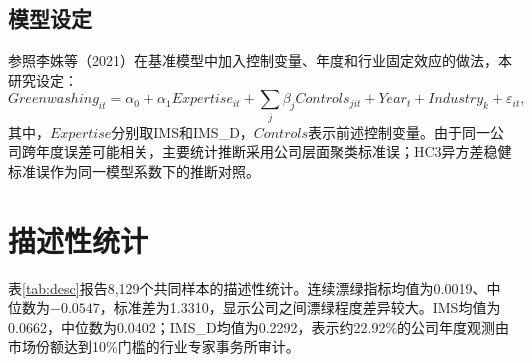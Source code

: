 \documentclass[UTF8,12pt,a4paper]{ctexart}
\begin{document}
\subsection{模型设定}

参照李姝等（2021）在基准模型中加入控制变量、年度和行业固定效应的做法，本研究设定：
\begin{equation}
Greenwashing_{it}=\alpha_0+\alpha_1Expertise_{it}
+\sum_j\beta_j Controls_{jit}+Year_t+Industry_k+\varepsilon_{it},
\label{eq:baseline}
\end{equation}
其中，$Expertise$分别取IMS和IMS\_D，$Controls$表示前述控制变量。由于同一公司跨年度误差可能相关，主要统计推断采用公司层面聚类标准误；HC3异方差稳健标准误作为同一模型系数下的推断对照。

\section{描述性统计}

表\ref{tab:desc}报告8,129个共同样本的描述性统计。连续漂绿指标均值为0.0019、中位数为$-0.0547$，标准差为1.3310，显示公司之间漂绿程度差异较大。IMS均值为0.0662，中位数为0.0402；IMS\_D均值为0.2292，表示约22.92\%的公司年度观测由市场份额达到10\%门槛的行业专家事务所审计。
\end{document}
